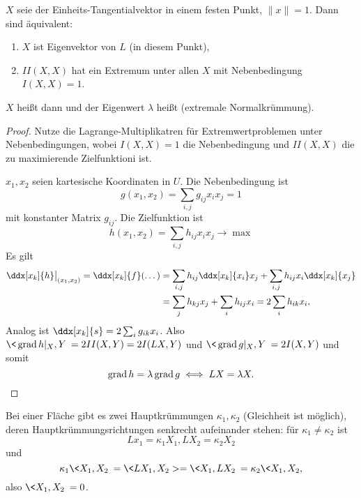 \begin{df}[Hauptkrümmungen]
	$X$ seie der Einheits-Tangentialvektor in einem festen Punkt, $\|x\| = 1$.
	Dann sind äquivalent:
	\begin{enumerate}[1)]
		\item
			$X$ ist Eigenvektor von $L$ (in diesem Punkt),
		\item
			$II(X, X)$ hat ein Extremum unter allen $X$ mit Nebenbedingung $I(X,X) = 1$.
	\end{enumerate}
	$X$ heißt dann  und der Eigenwert $\lambda$ heißt  (extremale Normalkrümmung).
	\begin{proof}
		Nutze die Lagrange-Multiplikatren für Extremwertproblemen unter Nebenbedingungen, wobei $I(X, X) = 1$ die Nebenbedingung und $II(X,X)$ die zu maximierende Zielfunktioni ist.

		$x_1, x_2$ seien kartesische Koordinaten in $U$.
		Die Nebenbedingung ist
		\[
			g(x_1, x_2) = \sum_{i,j} g_{ij} x_i x_j = 1
		\]
		mit konstanter Matrix $g_{ij}$.
		Die Zielfunktion ist
		\[
			h(x_1, x_2) = \sum_{i,j} h_{ij} x_i x_j \to \max
		\]
		Es gilt
		\begin{align*}
			\ddx[x_k]{h} \big|_{(x_1,x_2)} = \ddx[x_k]{f} (\dotsc)
			&= \sum_{i,j} h_{ij} \ddx[x_k]{x_i} x_j  + \sum_{i,j} h_{ij} x_i \ddx[x_k]{x_j} \\
			&= \sum_{j} h_{kj} x_j + \sum_{i} h_{ij} x_i
			= 2\sum_{i} h_{ik} x_i,
		\end{align*}
		Analog ist $\ddx[x_k]{s} = 2 \sum_{i} g_{ik} x_i$.
		Also $\< \grad h|_X, Y \> = 2 II(X, Y) = 2 I(LX, Y)$ und $\<\grad g|_X, Y\> = 2I(X, Y)$
		und somit
		\[
			\operatorname{grad} h = \lambda \operatorname{grad} g
			\iff
			LX = \lambda X.
		\]
	\end{proof}
	\begin{note}
		Bei einer Fläche gibt es zwei Hauptkrümmungen $\kappa_1, \kappa_2$ (Gleichheit ist möglich), deren Hauptkrümmungsrichtungen senkrecht aufeinander stehen:
		für $\kappa_1 \neq \kappa_2$ ist
		\[
			Lx_1 = \kappa_1 X_1, LX_2 = \kappa_2 X_2
		\]
		und
		\[
			\kappa_1 \<X_1, X_2\>
			= \<LX_1, X_2>
			= \<X_1, LX_2\>
			= \kappa_2 \< X_1, X_2,
		\]
		also $\<X_1, X_2 \> = 0$.
	\end{note}
\end{df}

